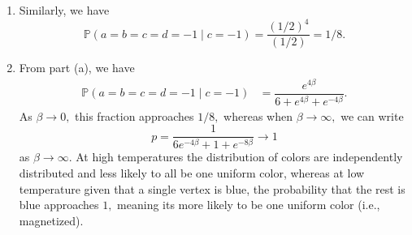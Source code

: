 \documentclass[12pt]{article}
\begin{document}
\begin{enumerate}
\begin{enumerate}
\begin{align*}
{          b(a-1)} \right) \left(\sum_{d = \pm 1} e^{\beta d(a-1)}\right) \\
          &= \sum_{a = \pm 1} 2\cosh (\beta (a - 1)) \cdot 2 \cosh
          (\beta(a - 1)) \\
          &= \sum_{a = \pm 1} 4 \cosh (\beta(a-1))^2 \\
          &= 4 \cosh(0)^2 + 4 \cosh(-2 \beta)^2 \\
          &= 4 + 4 \cosh (2 \beta)^2 \\
          &= 4(1 + \cosh^2(2 \beta)),
        \end{align*}
        yielding
        \begin{align*}
          \mathbb P(a = b = c = d = - 1 \mid c= -1) &=
          \dfrac{e^{4\beta}}{4(1 + \cosh^2(2\beta))} \\
          &= \dfrac{e^{4\beta}}{2(3 + \cosh(4\beta))}.
        \end{align*}
      \item Similarly, we have
        $$
        \mathbb P(a = b = c = d = -1 \mid c = -1) =
        \dfrac{(1/2)^4}{(1/2)} = 1/8.
        $$
      \item From part (a), we have
        \begin{align*}
          \mathbb P(a = b = c= d = -1 \mid c = -1) &=
          \dfrac{e^{4\beta}}{6 + e^{4\beta} + e^{-4\beta}}.
        \end{align*}
        As $\beta \to 0,$ this fraction approaches $
        1/8,
        $
        whereas when $\beta \to \infty,$ we can write
        $$
        p = \dfrac{1}{6e^{-4\beta} + 1 + e^{-8\beta}} \to 1
        $$
        as $\beta \to \infty.$
        At high temperatures the distribution of colors are
        independently distributed and less likely to all be one
        uniform color, whereas at low temperature given that a single
        vertex is blue, the probability that the rest is blue
        approaches $1,$ meaning its more likely to be one uniform
        color (i.e., magnetized).
    \end{enumerate}

\end{enumerate}
\end{document}
